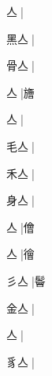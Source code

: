 \begin{multicols}{2}
{{亼{\cnjzr{}}}\mktsJzrVerticalBar{}{\cjk{}{\cnsym{}　}{\cnsym{}　}{\cnsym{}　}}|{}\par
{\cjk{}黑亼{\cnjzr{}}}\mktsJzrVerticalBar{}{\cjk{}{\cnsym{}　}{\cnsym{}　}{\cnsym{}　}}|{}\par
{\cjk{}骨亼{\cnjzr{}}}\mktsJzrVerticalBar{}{\cjk{}{\cnsym{}　}{\cnsym{}　}{\cnsym{}　}}|{}\par
{亼{\cnjzr{}}}|{\cjk{}旝}\par
{亼{\cnjzr{}}}\mktsJzrVerticalBar{}{\cjk{}{\cnsym{}　}{\cnsym{}　}{\cnsym{}　}}|{}\par
{\cjk{}毛亼{\cnjzr{}}}|{}\par
{\cjk{}禾亼{\cnjzr{}}}\mktsJzrVerticalBar{}{\cjk{}{\cnsym{}　}{\cnsym{}　}{\cnsym{}　}}|{}\par
{\cjk{}身亼{\cnjzr{}}}\mktsJzrVerticalBar{}{\cjk{}{\cnsym{}　}{\cnsym{}　}{\cnsym{}　}}|{}\par
{亼{\cnjzr{}}}\mktsJzrVerticalBar{}{\cjk{}{\cnsym{}　}{\cnsym{}　}{\cnsym{}　}}|{\cjk{}儈}\par
{亼{\cnjzr{}}}\mktsJzrVerticalBar{}{\cjk{}{\cnsym{}　}{\cnsym{}　}{\cnsym{}　}}|{\cjk{}徻}\par
{\cjk{}彡亼{\cnjzr{}}}|{\cjk{}鬠}\par
{\cjk{}金亼{\cnjzr{}}}\mktsJzrVerticalBar{}{\cjk{}{\cnsym{}　}{\cnsym{}　}{\cnsym{}　}}|{}\par
{亼{\cnjzr{}}}\mktsJzrVerticalBar{}{\cjk{}{\cnsym{}　}{\cnsym{}　}{\cnsym{}　}}|{}\par
{\cjk{}豸亼{\cnjzr{}}}\mktsJzrVerticalBar{}{\cjk{}{\cnsym{}　}{\cnsym{}　}{\cnsym{}　}}|{}\par
}
\end{multicols}
